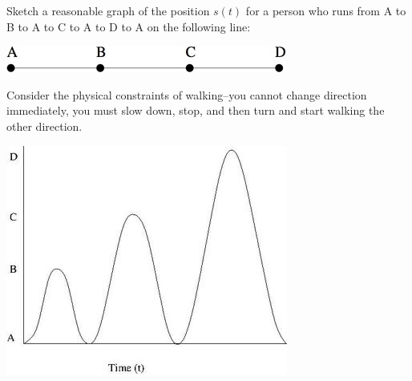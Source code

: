 \documentclass{ximera}
\author{Emma Smith Zbarsky}
\begin{document}
\begin{exercise}

Sketch a reasonable graph of the position $s(t)$ for a person who runs
from A to B to A to C to A to D to A on the following line:


\begin{image}\includegraphics[width=.5\textwidth]{line-with-pts.jpg}\end{image}


\begin{hint}
Consider the physical constraints of walking--you cannot change
direction immediately, you must slow down, stop, and then turn and start
walking the other direction.
\end{hint}


\begin{hint}
\begin{image}\includegraphics[width=.5\textwidth]{walkthelineb.jpg}\end{image}
\end{hint}



\end{exercise}
\end{document}
